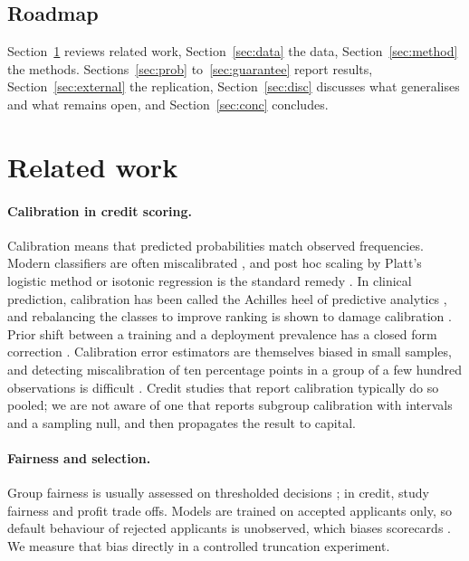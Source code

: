 \documentclass[11pt,a4paper]{article}
\begin{document}
\subsection{Roadmap}
Section~\ref{sec:related} reviews related work, Section~\ref{sec:data} the data, Section~\ref{sec:method} the methods. Sections~\ref{sec:prob} to~\ref{sec:guarantee} report results, Section~\ref{sec:external} the replication, Section~\ref{sec:disc} discusses what generalises and what remains open, and Section~\ref{sec:conc} concludes.

\section{Related work}\label{sec:related}
\paragraph{Calibration in credit scoring.} Calibration means that predicted probabilities match observed frequencies. Modern classifiers are often miscalibrated \citep{Guo2017}, and post hoc scaling by Platt's logistic method or isotonic regression is the standard remedy \citep{Platt1999,Niculescu2005,ZadroznyElkan2002}. In clinical prediction, calibration has been called the Achilles heel of predictive analytics \citep{VanCalster2019}, and rebalancing the classes to improve ranking is shown to damage calibration \citep{VanDenGoorbergh2022}. Prior shift between a training and a deployment prevalence has a closed form correction \citep{Saerens2002,Elkan2001}. Calibration error estimators are themselves biased in small samples, and detecting miscalibration of ten percentage points in a group of a few hundred observations is difficult \citep{Roelofs2022}. Credit studies that report calibration typically do so pooled; we are not aware of one that reports subgroup calibration with intervals and a sampling null, and then propagates the result to capital.

\paragraph{Fairness and selection.} Group fairness is usually assessed on thresholded decisions \citep{Hardt2016,Kleinberg2017,Chouldechova2017,Pleiss2017}; in credit, \citet{Kozodoi2022} study fairness and profit trade offs. Models are trained on accepted applicants only, so default behaviour of rejected applicants is unobserved, which biases scorecards \citep{BanasikCrook2007}. We measure that bias directly in a controlled truncation experiment.
\end{document}
